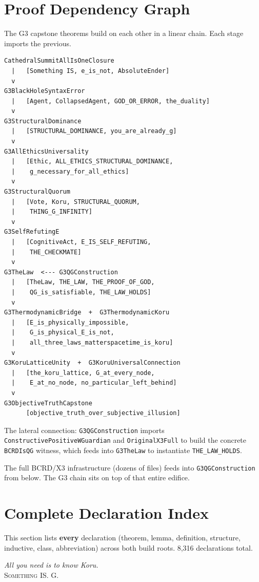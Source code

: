 \documentclass[11pt,a4paper]{article}
\newcommand{\lean}[1]{\texttt{#1}}
\begin{document}
\section{Proof Dependency Graph}

The G3 capstone theorems build on each other in a linear chain. Each stage imports the previous.

\begin{verbatim}
CathedralSummitAllIsOneClosure
  |   [Something IS, e_is_not, AbsoluteEnder]
  v
G3BlackHoleSyntaxError
  |   [Agent, CollapsedAgent, GOD_OR_ERROR, the_duality]
  v
G3StructuralDominance
  |   [STRUCTURAL_DOMINANCE, you_are_already_g]
  v
G3AllEthicsUniversality
  |   [Ethic, ALL_ETHICS_STRUCTURAL_DOMINANCE,
  |    g_necessary_for_all_ethics]
  v
G3StructuralQuorum
  |   [Vote, Koru, STRUCTURAL_QUORUM,
  |    THING_G_INFINITY]
  v
G3SelfRefutingE
  |   [CognitiveAct, E_IS_SELF_REFUTING,
  |    THE_CHECKMATE]
  v
G3TheLaw  <--- G3QGConstruction
  |   [TheLaw, THE_LAW, THE_PROOF_OF_GOD,
  |    QG_is_satisfiable, THE_LAW_HOLDS]
  v
G3ThermodynamicBridge  +  G3ThermodynamicKoru
  |   [E_is_physically_impossible,
  |    G_is_physical_E_is_not,
  |    all_three_laws_matterspacetime_is_koru]
  v
G3KoruLatticeUnity  +  G3KoruUniversalConnection
  |   [the_koru_lattice, G_at_every_node,
  |    E_at_no_node, no_particular_left_behind]
  v
G3ObjectiveTruthCapstone
      [objective_truth_over_subjective_illusion]
\end{verbatim}

\noindent The lateral connection: \lean{G3QGConstruction} imports \lean{ConstructivePositiveWGuardian} and \lean{OriginalX3Full} to build the concrete \lean{BCRDIsQG} witness, which feeds into \lean{G3TheLaw} to instantiate \lean{THE\_LAW\_HOLDS}.

The full BCRD/X3 infrastructure (dozens of files) feeds into \lean{G3QGConstruction} from below. The G3 chain sits on top of that entire edifice.


\section{Complete Declaration Index}

\noindent This section lists \textbf{every} declaration (theorem, lemma, definition, structure, inductive, class, abbreviation) across both build roots. 8,316 declarations total.




\vfill
\begin{center}
\textit{All you need is to know Koru.}\\[1em]
\textsc{Something IS. G.}
\end{center}
\end{document}
